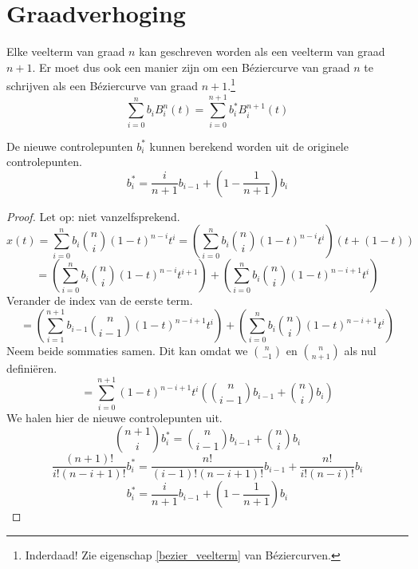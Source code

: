\documentclass[computergesteund_ontwerp_van_curven_en_oppervlakken.tex]{subfiles}
\begin{document}
\section{Graadverhoging}
Elke veelterm van graad $n$ kan geschreven worden als een veelterm van graad $n+1$. Er moet dus ook een manier zijn om een B\'eziercurve van graad $n$ te schrijven als een B\'eziercurve van graad $n+1$.\footnote{Inderdaad! Zie eigenschap \ref{bezier_veelterm} van B\'eziercurven.} 
\[
\sum_{i=0}^{n}b_iB_{i}^{n}(t) = \sum_{i=0}^{n+1}b_i^*B_{i}^{n+1}(t)
\]
\begin{st}
De nieuwe controlepunten $b_i^*$ kunnen berekend worden uit de originele controlepunten.
\[
b^*_i= \frac{i}{n+1}b_{i-1} + \left(1-\frac{1}{n+1}\right)b_i
\]
\begin{proof}
Let op: niet vanzelfsprekend.
\[
x(t)
= \sum_{i=0}^{n}b_i\binom{n}{i}(1-t)^{n-i}t^{i}
= \left(\sum_{i=0}^{n}b_i\binom{n}{i}(1-t)^{n-i}t^{i}\right) (t+(1-t))
\]
\[
= \left(\sum_{i=0}^{n}b_i\binom{n}{i}(1-t)^{n-i}t^{i+1}\right)
+ \left(\sum_{i=0}^{n}b_i\binom{n}{i}(1-t)^{n-i+1}t^{i}\right)
\]
Verander de index van de eerste term.
\[
= \left(\sum_{i=1}^{n+1}b_{i-1}\binom{n}{i-1}(1-t)^{n-i+1}t^{i}\right)
+ \left(\sum_{i=0}^{n}b_i\binom{n}{i}(1-t)^{n-i+1}t^{i}\right)
\]
Neem beide sommaties samen. Dit kan omdat we $\binom{n}{-1}$ en $\binom{n}{n+1}$ als nul defini\"eren.
\[
= \sum_{i=0}^{n+1}(1-t)^{n-i+1}t^{i} \left(\binom{n}{i-1}b_{i-1} + \binom{n}{i}b_i\right)
\]
We halen hier de nieuwe controlepunten uit.
\[
\binom{n+1}{i}b_{i}^{*}
= \binom{n}{i-1}b_{i-1}
+ \binom{n}{i}b_i
\]
\[
\frac{(n+1)!}{i!(n-i+1)!}b_{i}^{*}
= \frac{n!}{(i-1)!(n-i+1)!} b_{i-1}
+ \frac{n!}{i!(n-i)!}b_i
\]
\[
b_{i}^{*}
= \frac{i}{n+1} b_{i-1}
+ \left(1-\frac{1}{n+1}\right)b_i
\]
\end{proof}
\end{st}
\end{document}
